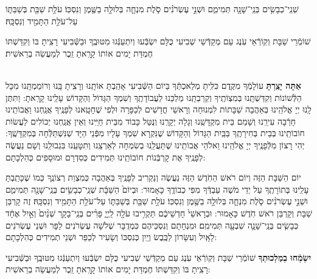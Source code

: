 \documentclass[twoside, openany, parskip=half, 11pt]{book}
\begin{document}
שְׁנֵֽי־כְבָשִׂ֥ים בְּנֵֽי־שָׁנָ֖ה תְּמִימִ֑ם וּשְׁנֵ֣י עֶשְׂרֹנִ֗ים סֹ֧לֶת מִנְחָ֛ה בְּלוּלָ֥ה בַשֶּׁ֖מֶן וְנִסְכּֽוֹ׃ עֹלַ֥ת שַׁבַּ֖ת בְּשַׁבַּתּ֑וֹ עַל־עֹלַ֥ת הַתָּמִ֖יד וְנִסְכָּֽהּ׃

 שׁוֹמְֿרֵי שַׁבָּת וְקֽוֹרְֿאֵי עֹֽנֶג עַם מְקַדְּֿשֵׁי שְׁבִיעִי כֻּלָּם יִשְׂבְּֿעוּ וְיִתְעַנְּֿגוּ מִטּוּבֶֽךָ וּבַשְּֿׁבִיעִי רָצִֽיתָ בּוֹ וְקִדַּשְׁתּוֹ חֶמְדַּת יָמִים אוֹתוֹ קָרָֽאתָ זֵֽכֶר לְמַעֲשֵׂה בְרֵאשִׁית׃

\shabboskiddushhayom {}

\begin{sometimes}

\label{shabbosroshchodesh}
\\
\textbf{אַתָּה יָצַֽרְתָּ}
 עוֹלָמְֿךָ מִקֶּֽדֶם כִּלִּֽיתָ מְלַאכְתְּֿךָ בַּיוֹם הַשְּֿׁבִיעִי אָהַֽבְתָּ אוֹתָֽנוּ וְרָצִֽיתָ בָּֽנוּ וְרוֹמַמְתָּֽנוּ מִכָּל הַלְּֿשׁוֹנוֹת וְקִדַּשְׁתָּֽנוּ בְּמִצְוֹתֶֽיךָ וְקֵרַבְתָּֽנוּ מַלְכֵּנוּ לַעֲבוֹדָתֶֽךָ וְשִׁמְךָ הַגָּדוֹל וְהַקָּדוֹשׁ עָלֵֽינוּ קָרָֽאתָ: וַתִּתֶּן לָֽנוּ יְיָ אֱלֹהֵֽינוּ בְּאַהֲבָה שַׁבָּתוֹת לִמְנוּחָה וְרָאשֵׁי חֳדָשִׁים לְכַפָּרָה וּלְפִי שֶׁחָטָֽאנוּ לְפָנֶֽיךָ אֲנַֽחְנוּ וַאֲבוֹתֵֽינוּ חָרְֿבָה עִירֵֽנוּ וְשָׁמֵם בֵּית מִקְדָּשֵֽׁנוּ וְגָלָה יְקָרֵֽנוּ וְנֻּטַּל כָּבוֹד מִבֵּית חַיֵּֽינוּ וְאֵין אֲנַֽחְנוּ יְכוֹלִים לַעֲשׂוֹת חוֹבוֹתֵֽינוּ בְּבֵית בְּחִירָתֶֽךָ בַּבַּֽיִת הַגָּדוֹל וְהַקָּדוֹשׁ שֶׁנִּקְרָא שִׁמְךָ עָלָיו מִפְּֿנֵי הַיָּד שְׁנִּשְׁתַּלְּֿחָה בְּמִקְדָּשֶֽׁךָ: יְהִי רָצוֹן מִלְּֿפָנֶֽיךָ יְיָ אֱלֹהֵֽינוּ וֵאלֹהֵי אֲבוֹתֵֽינוּ שֶׁתַּעֲלֵֽנוּ בְשִׂמְחָה לְאַרְצֵֽנוּ וְתִטָּעֵֽנוּ בִּגְבוּלֵֽנוּ וְשָׁם נַעֲשֶׂה לְפָנֶֽיךָ אֶת קָרְבְּֿנוֹת חוֹבוֹתֵֽינוּ תְּמִידִים כְּסִדְרָם וּמוּסָפִים כְּהִלְכָתָם: 
 
 יוֹם הַשַּׁבָּת הַזֶּה וְיוֹם רֹאשׁ הַחֹֽדֶשׁ הַזֶּה נַעֲשֶׂה וְנַקְרִיב לְפָנֶֽיךָ בְּאַהֲבָה כְּמִצְוַת רְצוֹנֶֽךָ כְּמוֹ שֶׁכָּתַֽבְתָּ עָלֵֽינוּ בְּתוֹרָתֶֽךָ עַל יְדֵי מֹשֶׁה עַבְדְּֿךָ מִפִּי כְבוֹדֶֽךָ כָּאָמוּר: וּבְיוֹם֙ הַשַּׁבָּ֔ת שְׁנֵֽי־כְבָשִׂ֥ים בְּנֵֽי־שָׁנָ֖ה תְּמִימִ֑ם וּשְׁנֵ֣י עֶשְׂרֹנִ֗ים סֹ֧לֶת מִנְחָ֛ה בְּלוּלָ֥ה בַשֶּׁ֖מֶן וְנִסְכּֽוֹ׃ עֹלַ֥ת שַׁבַּ֖ת בְּשַׁבַּתּ֑וֹ עַל־עֹלַ֥ת הַתָּמִ֖יד וְנִסְכָּֽהּ׃ זֶה קָרְבַּן שַׁבָּת וְקָרְבַּן רֹאשׁ חֹֽדֶשׁ כָּאָמוּר: וּבְרָאשֵׁי֙ חָדְשֵׁיכֶ֔ם תַּקְרִ֥יבוּ עֹלָ֖ה לַֽיְיָ֑ פָּרִ֨ים בְּנֵֽי־בָקָ֤ר שְׁנַ֨יִם֙ וְאַ֣יִל אֶחָ֔ד כְּבָשִׂ֧ים בְּנֵֽי־שָׁנָ֛ה שִׁבְעָ֖ה תְּמִימִֽם׃ וּמִנְחָתָם וְנִסְכֵּיהֶם כִּמְדֻבָּר שְׁלֹשָׁה עֶשְׂרֹנִים לַפָּר וּשְׁנֵי עֶשְׂרֹנִים לָאָֽיִל וְעִשָּׂרוֹן לַכֶּֽבֶשׂ וְיַֽיִן כְּנִסְכּוֹ וְשָׂעִיר לְכַפֵּר וּשְׁנֵי תְמִידִים כְּהִלְכָתָם:

\textbf{יִשְׂמְֿחוּ בְמַלְכוּתְךָ}
 שׁוֹמְֿרֵי שַׁבָּת וְקֽוֹרְֿאֵי עֹֽנֶג עַם מְקַדְּֿשֵׁי שְׁבִיעִי כֻּלָּם יִשְׂבְּֿעוּ וְיִתְעַנְּֿגוּ מִטּוּבֶֽךָ וּבַשְּֿׁבִיעִי רָצִֽיתָ בּוֹ וְקִדַּשְׁתּוֹ חֶמְדַּת יָמִים אוֹתוֹ קָרָֽאתָ זֵֽכֶר לְמַעֲשֵׂה בְרֵאשִׁית:
 

\end{sometimes}
\end{document}
